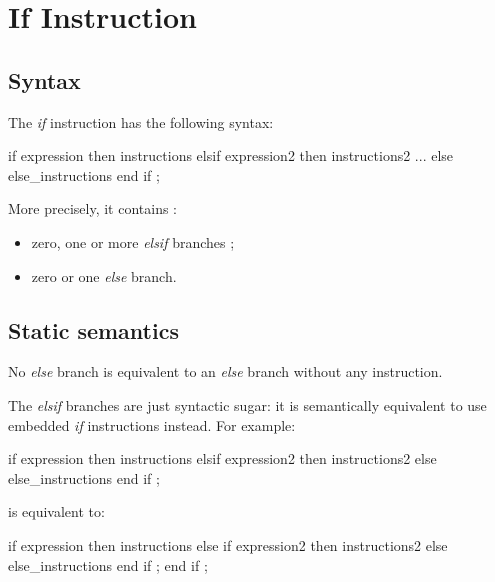 









\section{If Instruction}


\subsection{Syntax}

The \emph{if} instruction has the following syntax:
{
\begin{galgascode}
if expression then
  instructions
elsif expression2 then
  instructions2
...
else
  else_instructions
end if ;  
\end{galgascode}
}

More precisely, it contains :
\begin{itemize}
\item zero, one or more \emph{elsif} branches ;
\item zero or one \emph{else} branch.
\end{itemize}


\subsection{Static semantics}


No \emph{else} branch is equivalent to an \emph{else} branch without any instruction.


The \emph{elsif} branches are just syntactic sugar: it is semantically equivalent to use embedded \emph{if} instructions instead. For example:
{
\begin{galgascode}
if expression then
  instructions
elsif expression2 then
  instructions2
else
  else_instructions
end if ;  
\end{galgascode}
}
is equivalent to:
{
\begin{galgascode}
if expression then
  instructions
else
  if expression2 then
    instructions2
  else
    else_instructions
  end if ;  
end if ;  
\end{galgascode}
}

